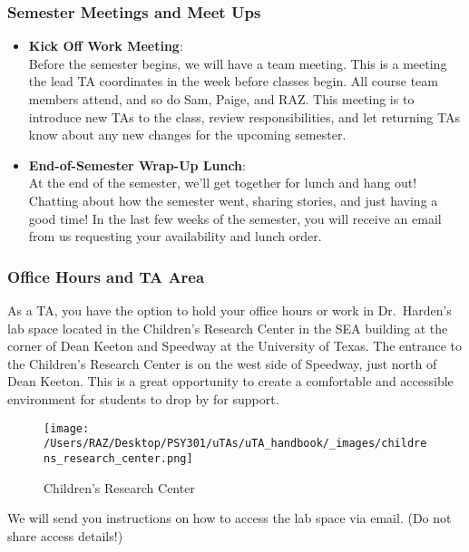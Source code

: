 \documentclass[
]{article}
\begin{document}
\hypertarget{semester-meetings-and-meet-ups}{%
\subsubsection{Semester Meetings and Meet Ups}\label{semester-meetings-and-meet-ups}}

\begin{itemize}
\item
  \textbf{Kick Off Work Meeting}:\\
  Before the semester begins, we will have a team meeting. This is a meeting the lead TA coordinates in the week before classes begin. All course team members attend, and so do Sam, Paige, and RAZ. This meeting is to introduce new TAs to the class, review responsibilities, and let returning TAs know about any new changes for the upcoming semester.
\item
  \textbf{End-of-Semester Wrap-Up Lunch}:\\
  At the end of the semester, we'll get together for lunch and hang out! Chatting about how the semester went, sharing stories, and just having a good time! In the last few weeks of the semester, you will receive an email from us requesting your availability and lunch order.
\end{itemize}

\hypertarget{office-hours-and-ta-area}{%
\subsubsection{Office Hours and TA Area}\label{office-hours-and-ta-area}}

As a TA, you have the option to hold your office hours or work in Dr.~Harden's lab space located in the Children's Research Center in the SEA building at the corner of Dean Keeton and Speedway at the University of Texas. The entrance to the Children's Research Center is on the west side of Speedway, just north of Dean Keeton. This is a great opportunity to create a comfortable and accessible environment for students to drop by for support.

\begin{figure}
\centering
\texttt{[image: /Users/RAZ/Desktop/PSY301/uTAs/uTA\_handbook/\_images/childrens\_research\_center.png]}
\caption{Children's Research Center}
\end{figure}

We will send you instructions on how to access the lab space via email. (Do not share access details!)
\end{document}
